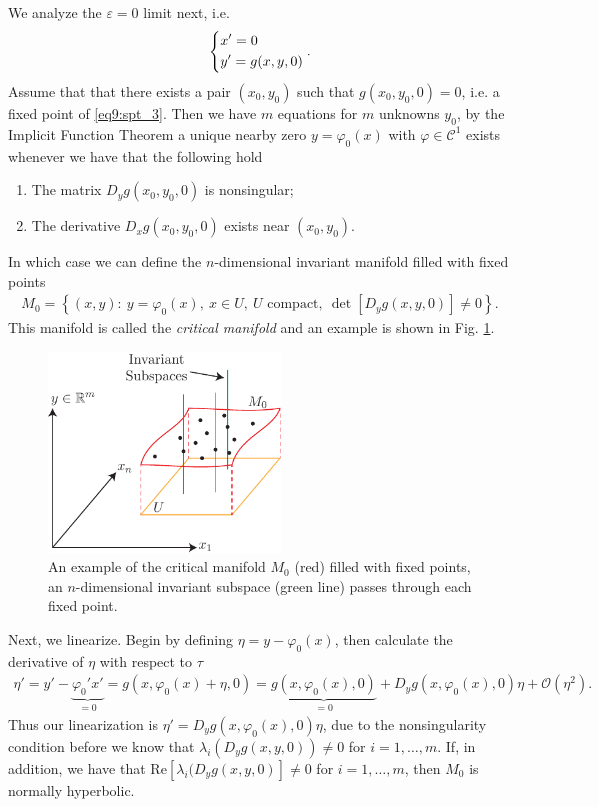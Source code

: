 We analyze the $\varepsilon=0$ limit next, i.e.
\begin{align}
	\begin{dcases}
		x' = 0 \\
		y' = g(x,y,0)
	\end{dcases}
	.\label{eq9:spt_3}
\end{align}
Assume that that there exists a pair $(x_0, y_0)$ such that $g(x_0, y_0,0)=0$, i.e. a fixed point of \eqref{eq9:spt_3}. Then we have $m$ equations for $m$ unknowns $y_0$, by the Implicit Function Theorem a unique nearby zero $y = \varphi_0(x)$ with $\varphi \in \mathcal{C}^{1}$ exists whenever we have that the following hold
\begin{enumerate}
	\item The matrix $D_{y}g(x_0, y_0, 0)$ is nonsingular;
	\item The derivative $D_{x}g(x_0, y_0, 0)$ exists near $(x_0, y_0)$.
\end{enumerate}
In which case we can define the $n$-dimensional invariant manifold filled with fixed points 
\begin{align}
\boxed{
M_0 = \left\{ (x,y):\ y= \varphi_0(x),\ x\in U,\ U  \textrm{ compact},\ \det\left[D_{y}g(x,y,0)\right]\neq 0 \right\} .
}
\end{align}
This manifold is called the \emph{critical manifold} and an example is shown in Fig. \ref{fig:critical_mfd_def}.
\begin{figure}[h!]
	\centering
	\includegraphics[width=0.55\textwidth]{figures/ch9/17crit_mfd_def.pdf}
	\caption{An example of the critical manifold $M_0$ (red) filled with fixed points, an $n$-dimensional invariant subspace (green line) passes through each fixed point.}
	\label{fig:critical_mfd_def}
\end{figure}

Next, we linearize. Begin by defining $\eta = y - \varphi_0(x)$, then calculate the derivative of $\eta $ with respect to $\tau$ 
\begin{align}
	\eta' = y' - \underbrace{\varphi_0' x'}_{=0} = g(x, \varphi_0(x) + \eta, 0) = \underbrace{g(x, \varphi_0(x), 0) }_{=0} + D_{y}g(x, \varphi_0(x), 0) \eta + \mathcal{O}(\eta^2).
\end{align}
Thus our linearization is $\eta' = D_{y} g(x, \varphi_0(x), 0 ) \eta$, due to the nonsingularity condition before we know that $\lambda_{i}(D_{y}g(x,y,0)) \neq 0$ for $i=1,\ldots, m$. If, in addition, we have that $ \textrm{Re}[\lambda_i(D_{y}g(x,y,0)]\neq 0  $ for $i = 1, \ldots, m$, then $M_0$ is normally hyperbolic.

